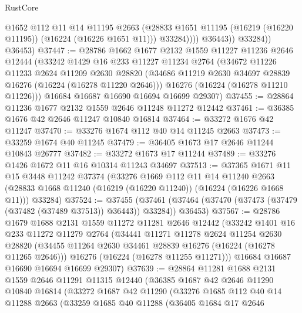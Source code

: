 \begin{lexlean}{RustCore}
\begin{coremodule}
                      @1652
                      @112
                      @11
                      @14
                      @11195
                      @2663
                      (@28833 @1651 @11195 (@16219 (@16220 @11195)) (@16224 (@16226 @1651 @11)))
                      @33284))))
              @36443))
          @33284))
      @36453)
@37447 := @28786
    @1662
    @1677
    @2132
    @1559
    @11227
    @11236
    @2646
    @12444
    (@33242
      @1429
      @16
      @233
      @11227
      @11234
      @2764
      (@34672
        @11226
        @11233
        @2624
        @11209
        @2630
        @28820
        (@34686 @11219 @2630 @34697 @28839 @16276 (@16224 (@16278 @11220 @2646)))
        @16276
        (@16224 (@16278 @11210 @11226)))
      @16684
      @16687
      @16690
      @16694
      @16699
      @29307)
@37455 := @28864 @11236 @1677 @2132 @1559 @2646 @11248 @11272 @12442
@37461 := @36385 @1676 @42 @2646 @11247 @10840 @16814
@37464 := @33272 @1676 @42 @11247
@37470 := @33276 @1674 @112 @40 @14 @11245 @2663
@37473 := @33259 @1674 @40 @11245
@37479 := @36405 @1673 @17 @2646 @11244 @10843 @26777
@37482 := @33272 @1673 @17 @11244
@37489 := @33276 @1426 @1672 @11 @16 @10314 @11243 @34697
@37513 := @37365
    @1671
    @11
    @15
    @3448
    @11242
    @37374
    (@33276
      @1669
      @112
      @11
      @14
      @11240
      @2663
      (@28833 @1668 @11240 (@16219 (@16220 @11240)) (@16224 (@16226 @1668 @11)))
      @33284)
@37524 := @37455
    (@37461 (@37464 (@37470 (@37473 (@37479 (@37482 (@37489 @37513)) @36443)) @33284)) @36453)
@37567 := @28786
    @1679
    @1688
    @2131
    @1559
    @11272
    @11281
    @2646
    @12442
    (@33242
      @1401
      @16
      @233
      @11272
      @11279
      @2764
      (@34441
        @11271
        @11278
        @2624
        @11254
        @2630
        @28820
        (@34455 @11264 @2630 @34461 @28839 @16276 (@16224 (@16278 @11265 @2646)))
        @16276
        (@16224 (@16278 @11255 @11271)))
      @16684
      @16687
      @16690
      @16694
      @16699
      @29307)
@37639 := @28864
    @11281
    @1688
    @2131
    @1559
    @2646
    @11291
    @11315
    @12440
    (@36385
      @1687
      @42
      @2646
      @11290
      @10840
      @16814
      (@33272
        @1687
        @42
        @11290
        (@33276
          @1685
          @112
          @40
          @14
          @11288
          @2663
          (@33259
            @1685
            @40
            @11288
            (@36405
              @1684
              @17
              @2646

\end{coremodule}
\end{lexlean}
